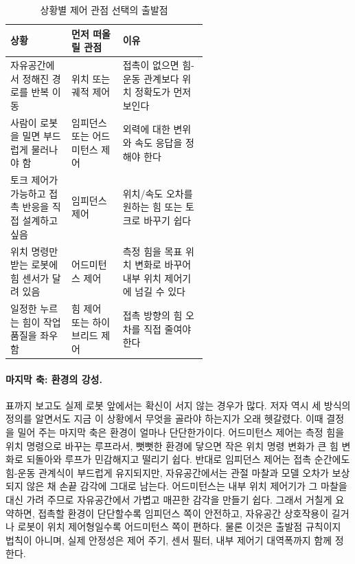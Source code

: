 \begin{table}[!htbp]
  \centering
  \caption{상황별 제어 관점 선택의 출발점}
  \small
  \setlength{\tabcolsep}{4pt}
  \begin{tabularx}{\linewidth}{@{}>{\raggedright\arraybackslash}p{0.31\linewidth}>{\raggedright\arraybackslash}p{0.26\linewidth}>{\raggedright\arraybackslash}X@{}}
    \toprule
    상황 & 먼저 떠올릴 관점 & 이유 \\
    \midrule
    자유공간에서 정해진 경로를 반복 이동 & 위치 또는 궤적 제어 & 접촉이 없으면 힘-운동 관계보다 위치 정확도가 먼저 보인다 \\
    사람이 로봇을 밀면 부드럽게 물러나야 함 & 임피던스 또는 어드미턴스 제어 & 외력에 대한 변위와 속도 응답을 정해야 한다 \\
    토크 제어가 가능하고 접촉 반응을 직접 설계하고 싶음 & 임피던스 제어 & 위치/속도 오차를 원하는 힘 또는 토크로 바꾸기 쉽다 \\
    위치 명령만 받는 로봇에 힘 센서가 달려 있음 & 어드미턴스 제어 & 측정 힘을 목표 위치 변화로 바꾸어 내부 위치 제어기에 넘길 수 있다 \\
    일정한 누르는 힘이 작업 품질을 좌우함 & 힘 제어 또는 하이브리드 제어 & 접촉 방향의 힘 오차를 직접 줄여야 한다 \\
    \bottomrule
  \end{tabularx}
\end{table}

\paragraph{마지막 축: 환경의 강성.}
표까지 보고도 실제 로봇 앞에서는 확신이 서지 않는 경우가 많다.
저자 역시 세 방식의 정의를 알면서도 지금 이 상황에서 무엇을 골라야 하는지가 오래 헷갈렸다.
이때 결정을 밀어 주는 마지막 축은 환경이 얼마나 단단한가이다.
%
어드미턴스 제어는 측정 힘을 위치 명령으로 바꾸는 루프라서, 뻣뻣한 환경에 닿으면 작은 위치 명령 변화가 큰 힘 변화로 되돌아와 루프가 민감해지고 떨리기 쉽다.
반대로 임피던스 제어는 접촉 순간에도 힘-운동 관계식이 부드럽게 유지되지만, 자유공간에서는 관절 마찰과 모델 오차가 보상되지 않은 채 손끝 감각에 그대로 남는다.
어드미턴스는 내부 위치 제어기가 그 마찰을 대신 가려 주므로 자유공간에서 가볍고 매끈한 감각을 만들기 쉽다.
그래서 거칠게 요약하면, 접촉할 환경이 단단할수록 임피던스 쪽이 안전하고, 자유공간 상호작용이 길거나 로봇이 위치 제어형일수록 어드미턴스 쪽이 편하다.
%
물론 이것은 출발점 규칙이지 법칙이 아니며, 실제 안정성은 제어 주기, 센서 필터, 내부 제어기 대역폭까지 함께 정한다.

